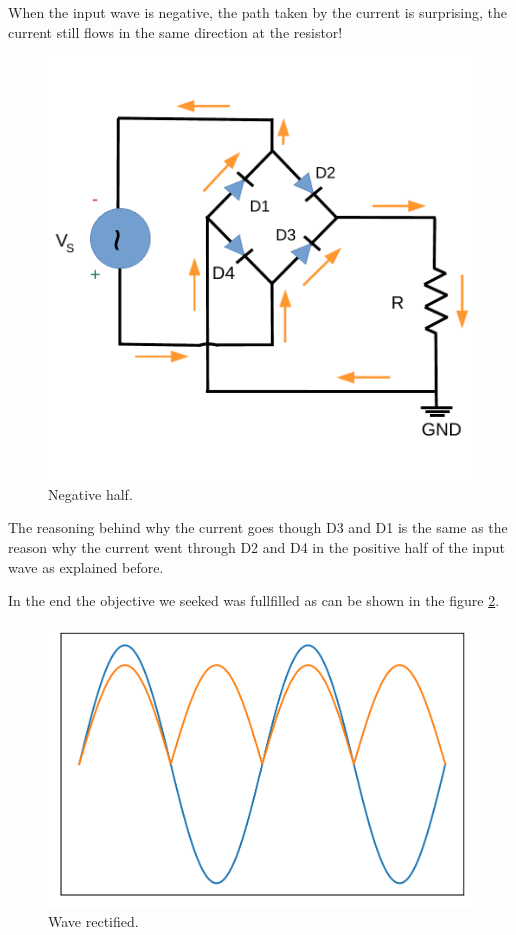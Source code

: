 When the input wave is negative, the path taken by the current is surprising, the current still flows in the same direction at the resistor!
\begin{figure}[h] \centering
    \includegraphics[scale=0.4]{lab3 _negative.pdf}
    \caption{Negative half.}
    \label{fig:rc3}
\end{figure}

The reasoning behind why the current goes though D3 and D1 is the same as
the reason why the current went through D2 and D4 in the positive half of the input wave as explained before.

In the end the objective we seeked was fullfilled as can be shown in the figure \ref{fig:rc4}.
\begin{figure}[h] \centering
    \includegraphics[scale=0.75]{rectwave.png}
    \caption{Wave rectified.}
    \label{fig:rc4}
\end{figure}

